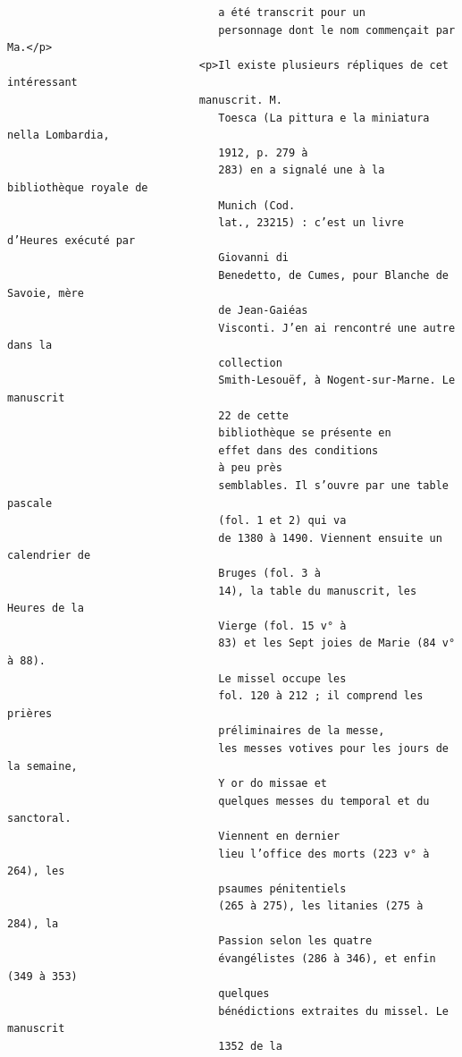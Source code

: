 \documentclass[a4paper,12pt,twoside]{book}
\begin{document}
\begin{verbatim}
                                 a été transcrit pour un
                                 personnage dont le nom commençait par Ma.</p>
                              <p>Il existe plusieurs répliques de cet intéressant
                              manuscrit. M.
                                 Toesca (La pittura e la miniatura nella Lombardia,
                                 1912, p. 279 à
                                 283) en a signalé une à la bibliothèque royale de
                                 Munich (Cod.
                                 lat., 23215) : c’est un livre d’Heures exécuté par
                                 Giovanni di
                                 Benedetto, de Cumes, pour Blanche de Savoie, mère
                                 de Jean-Gaiéas
                                 Visconti. J’en ai rencontré une autre dans la 
                                 collection
                                 Smith-Lesouëf, à Nogent-sur-Marne. Le manuscrit
                                 22 de cette
                                 bibliothèque se présente en 
                                 effet dans des conditions
                                 à peu près
                                 semblables. Il s’ouvre par une table pascale 
                                 (fol. 1 et 2) qui va
                                 de 1380 à 1490. Viennent ensuite un calendrier de
                                 Bruges (fol. 3 à
                                 14), la table du manuscrit, les Heures de la 
                                 Vierge (fol. 15 v° à
                                 83) et les Sept joies de Marie (84 v° à 88).
                                 Le missel occupe les
                                 fol. 120 à 212 ; il comprend les prières 
                                 préliminaires de la messe,
                                 les messes votives pour les jours de la semaine, 
                                 Y or do missae et
                                 quelques messes du temporal et du sanctoral. 
                                 Viennent en dernier
                                 lieu l’office des morts (223 v° à 264), les
                                 psaumes pénitentiels
                                 (265 à 275), les litanies (275 à 284), la
                                 Passion selon les quatre
                                 évangélistes (286 à 346), et enfin (349 à 353)
                                 quelques
                                 bénédictions extraites du missel. Le manuscrit
                                 1352 de la

\end{verbatim}
\end{document}
